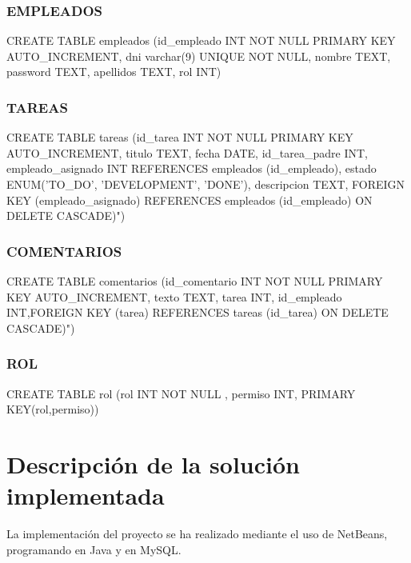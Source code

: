 \documentclass[paper=a4, fontsize=11pt, spanish]{scrartcl}
\begin{document}
\subsubsection{EMPLEADOS}
CREATE TABLE empleados (id\_empleado INT NOT NULL PRIMARY KEY AUTO\_INCREMENT, dni varchar(9) UNIQUE NOT NULL,  nombre TEXT, password TEXT, apellidos TEXT, rol INT)

\subsubsection{TAREAS}
CREATE TABLE tareas (id\_tarea INT NOT NULL PRIMARY KEY AUTO\_INCREMENT, titulo TEXT, fecha DATE, id\_tarea\_padre INT, empleado\_asignado INT REFERENCES empleados (id\_empleado), estado ENUM('TO\_DO', 'DEVELOPMENT', 'DONE'), descripcion TEXT, FOREIGN KEY (empleado\_asignado) REFERENCES empleados (id\_empleado) ON DELETE CASCADE)")

\subsubsection{COMENTARIOS}
CREATE TABLE comentarios (id\_comentario INT NOT NULL PRIMARY KEY AUTO\_INCREMENT, texto TEXT, tarea INT, id\_empleado INT,FOREIGN KEY (tarea) REFERENCES tareas (id\_tarea) ON DELETE CASCADE)")

\subsubsection{ROL}
CREATE TABLE rol (rol INT NOT NULL , permiso INT, PRIMARY KEY(rol,permiso))

\section{Descripción de la solución implementada}
La implementación del proyecto se ha realizado mediante el uso de NetBeans, programando en Java y en MySQL.
\end{document}
